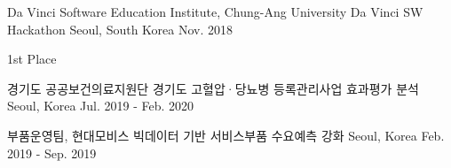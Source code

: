 \documentclass[11pt, a4paper]{awesome-cv} %
\begin{document}

\begin{cventries}
	\cventry
	{Da Vinci Software Education Institute, Chung-Ang University} %
	{Da Vinci SW Hackathon} %
	{Seoul, South Korea} %
	{Nov. 2018} %
	{
		\begin{cvitems}
			\item{1st Place}
		\end{cvitems}
	}
\end{cventries}



\begin{cventries}


	\cventry
	{경기도 공공보건의료지원단} %
	{경기도 고혈압·당뇨병 등록관리사업 효과평가 분석} %
	{Seoul, Korea} %
	{Jul. 2019 - Feb. 2020} %
	{}
	
	\cventry
	{부품운영팀, 현대모비스} %
	{빅데이터 기반 서비스부품 수요예측 강화} %
	{Seoul, Korea} %
	{Feb. 2019 - Sep. 2019} %
	{ %
	}
\end{cventries}


\end{document}
